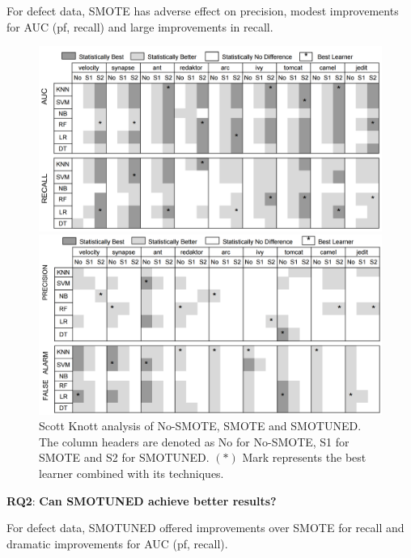 \documentclass[10pt,conference]{IEEEtran}
\theoremstyle{break}
\theoremstyle{break}
\newcommand{\sma}{{\sc SMOTE}}
\newcommand{\smb}{{\sc SMOTUNED}}
\begin{document}
 \begin{lesson}For defect data, {\sma} has adverse effect on 
 precision, modest improvements for AUC (pf, recall) and large improvements in recall.
 \end{lesson}



\begin{figure}[!htbp]
\begin{minipage}{.5\linewidth}
\centering
        \includegraphics[width=.9\linewidth]{./fig/AUC_recall.png}
            \end{minipage}%
\begin{minipage}{.5\linewidth}
        \centering
        \includegraphics[width=.9\linewidth]{./fig/prec_pf.png}
    \end{minipage}%
    \caption{Scott Knott analysis of No-SMOTE, SMOTE and SMOTUNED. The column headers are denoted as No for No-SMOTE, S1 for SMOTE and S2 for SMOTUNED. $(\ast)$ Mark represents the best learner combined with its techniques.}
    \label{fig:stats}
\vspace{-0.2cm}
\end{figure}

 \textbf{RQ2}: \textbf{Can {\smb} achieve better results?} 
 
 \begin{lesson}For defect data, {\smb}  
 offered    improvements over {\sma} for recall
 and dramatic improvements for AUC (pf, recall).
 \end{lesson}
 
\end{document}
